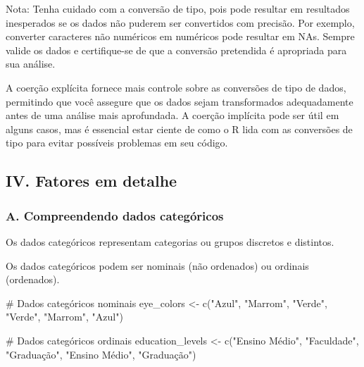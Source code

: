\documentclass[
  letterpaper,
  DIV=11,
  numbers=noendperiod]{scrartcl}
\newenvironment{Shaded}{\begin{snugshade}}{\end{snugshade}}
\newcommand{\CommentTok}[1]{\textcolor[rgb]{0.37,0.37,0.37}{#1}}
\newcommand{\FunctionTok}[1]{\textcolor[rgb]{0.28,0.35,0.67}{#1}}
\newcommand{\NormalTok}[1]{\textcolor[rgb]{0.00,0.23,0.31}{#1}}
\newcommand{\OtherTok}[1]{\textcolor[rgb]{0.00,0.23,0.31}{#1}}
\newcommand{\StringTok}[1]{\textcolor[rgb]{0.13,0.47,0.30}{#1}}
\begin{document}
Nota: Tenha cuidado com a conversão de tipo, pois pode resultar em
resultados inesperados se os dados não puderem ser convertidos com
precisão. Por exemplo, converter caracteres não numéricos em numéricos
pode resultar em NAs. Sempre valide os dados e certifique-se de que a
conversão pretendida é apropriada para sua análise.

A coerção explícita fornece mais controle sobre as conversões de tipo de
dados, permitindo que você assegure que os dados sejam transformados
adequadamente antes de uma análise mais aprofundada. A coerção implícita
pode ser útil em alguns casos, mas é essencial estar ciente de como o R
lida com as conversões de tipo para evitar possíveis problemas em seu
código.

\hypertarget{iv.-fatores-em-detalhe}{%
\subsection{IV. Fatores em detalhe}\label{iv.-fatores-em-detalhe}}

\hypertarget{a.-compreendendo-dados-categuxf3ricos}{%
\subsubsection{A. Compreendendo dados
categóricos}\label{a.-compreendendo-dados-categuxf3ricos}}

Os dados categóricos representam categorias ou grupos discretos e
distintos.

Os dados categóricos podem ser nominais (não ordenados) ou ordinais
(ordenados).

\begin{Shaded}
\begin{Highlighting}[]
\CommentTok{\# Dados categóricos nominais}
\NormalTok{eye\_colors }\OtherTok{\textless{}{-}} \FunctionTok{c}\NormalTok{(}\StringTok{"Azul"}\NormalTok{, }\StringTok{"Marrom"}\NormalTok{, }\StringTok{"Verde"}\NormalTok{, }\StringTok{"Verde"}\NormalTok{, }\StringTok{"Marrom"}\NormalTok{, }\StringTok{"Azul"}\NormalTok{)}

\CommentTok{\# Dados categóricos ordinais}
\NormalTok{education\_levels }\OtherTok{\textless{}{-}} \FunctionTok{c}\NormalTok{(}\StringTok{"Ensino Médio"}\NormalTok{, }\StringTok{"Faculdade"}\NormalTok{, }\StringTok{"Graduação"}\NormalTok{, }\StringTok{"Ensino Médio"}\NormalTok{, }\StringTok{"Graduação"}\NormalTok{)}
\end{Highlighting}
\end{Shaded}
\end{document}
